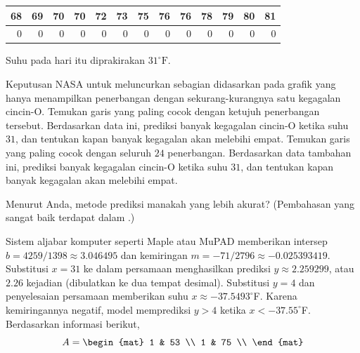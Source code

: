 \begin{exercises}
\begin{center}
      \hspace*{3em}\begin{tabular}{|rrrrrrrrrrrrr}
                68 &69 &70 &70 &72 &73 &75 &76 &76 &78 &79 &80 &81\\
         \hline
                0  &0  &0  &0  &0  &0  &0  &0  &0  &0  &0  &0  &0
      \end{tabular}
    \end{center}
    Suhu pada hari itu diprakirakan \( 31^\circ\text{F} \).
    \begin{exparts}
      \partsitem Keputusan NASA untuk meluncurkan sebagian didasarkan pada grafik
        yang hanya menampilkan penerbangan dengan sekurang-kurangnya satu
        kegagalan cincin-O. Temukan garis yang paling cocok dengan ketujuh
        penerbangan tersebut. Berdasarkan data ini, prediksi banyak kegagalan
        cincin-O ketika suhu $31$, dan tentukan kapan banyak kegagalan akan
        melebihi empat.
      \partsitem Temukan garis yang paling cocok dengan seluruh $24$ penerbangan.
        Berdasarkan data tambahan ini, prediksi banyak kegagalan cincin-O ketika
        suhu $31$, dan tentukan kapan banyak kegagalan akan melebihi empat.
    \end{exparts}
    Menurut Anda, metode prediksi manakah yang lebih akurat?
    (Pembahasan yang sangat baik terdapat dalam \cite{Stats}.)
    \begin{answer}
      \begin{exparts}
        \partsitem Sistem aljabar komputer seperti Maple atau MuPAD memberikan
          intersep $b=4259/1398\approx 3.046495$ dan kemiringan
          $m=-71/2796\approx -0.025393419$.
          Substitusi $x=31$ ke dalam persamaan menghasilkan prediksi
          $y\approx 2.259299$, atau $2.26$ kejadian (dibulatkan ke dua tempat
          desimal).
          Substitusi $y=4$ dan penyelesaian persamaan memberikan suhu
          $x\approx -37.5493^\circ$F. Karena kemiringannya negatif, model
          memprediksi $y>4$ ketika $x<-37.55^\circ$F.
        \partsitem Berdasarkan informasi berikut,
          \begin{equation*}
            A =  
            \begin{mat}
               1 & 53 \\
               1 & 75 \\

\end{mat}
\end{equation*}
\end{exparts}
\end{answer}
\end{exercises}

